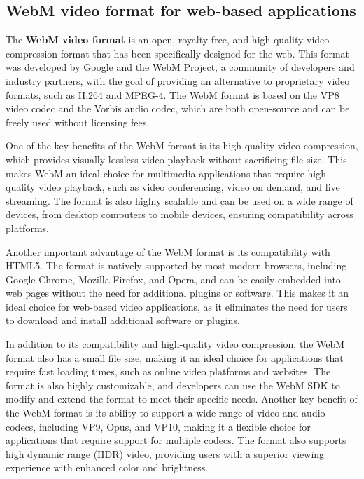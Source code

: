 \subsection{WebM video format for web-based applications}
The \textbf{WebM video format} is an open, royalty-free, and high-quality video compression format 
that has been specifically designed for the web. This format was developed by Google and 
the WebM Project, a community of developers and industry partners, with the goal of 
providing an alternative to proprietary video formats, such as H.264 and MPEG-4. 
The WebM format is based on the VP8 video codec and the Vorbis audio codec, 
which are both open-source and can be freely used without licensing fees.

One of the key benefits of the WebM format is its high-quality video compression, 
which provides visually lossless video playback without sacrificing file size. 
This makes WebM an ideal choice for multimedia applications that require 
high-quality video playback, such as video conferencing, video on demand, and live streaming. The format 
is also highly scalable and can be used on a wide range of devices, from desktop computers to mobile 
devices, ensuring compatibility across platforms.

Another important advantage of the WebM format is its compatibility with HTML5. The format is 
natively supported by most modern browsers, including Google Chrome, Mozilla Firefox, and Opera, 
and can be easily embedded into web pages without the need for additional plugins or software. 
This makes it an ideal choice for web-based video applications, as it eliminates the need for 
users to download and install additional software or plugins.

In addition to its compatibility and high-quality video compression, the WebM format also has 
a small file size, making it an ideal choice for applications that require fast loading times, 
such as online video platforms and websites. The format is also highly customizable, and developers 
can use the WebM SDK to modify and extend the format to meet their specific needs.
Another key benefit of the WebM format is its ability to support a wide range of video and audio 
codecs, including VP9, Opus, and VP10, making it a flexible choice for applications that require 
support for multiple codecs. The format also supports high dynamic range (HDR) video, providing 
users with a superior viewing experience with enhanced color and brightness. \cite{webm}

